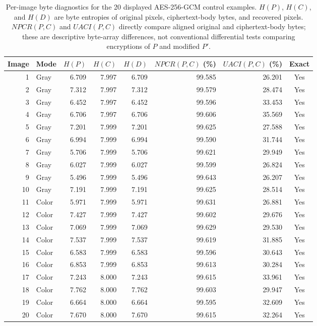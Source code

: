 \documentclass[letterpaper,journal]{IEEEtran}
\begin{document}
\begin{table}[!t]
\caption{Per-image byte diagnostics for the 20 displayed AES-256-GCM control examples. $H(P)$, $H(C)$, and $H(D)$ are byte entropies of original pixels, ciphertext-body bytes, and recovered pixels. $NPCR(P,C)$ and $UACI(P,C)$ directly compare aligned original and ciphertext-body bytes; these are descriptive byte-array differences, not conventional differential tests comparing encryptions of $P$ and modified $P'$.}
\label{tab:per-image-metrics}
\centering\small
\setlength{\tabcolsep}{4pt}\renewcommand{\arraystretch}{1.05}
\begin{tabular}{rlrrrrrc}
\toprule
Image & Mode & $H(P)$ & $H(C)$ & $H(D)$ & $NPCR(P,C)$ (\%) & $UACI(P,C)$ (\%) & Exact \\
\midrule
1 & Gray & 6.709 & 7.997 & 6.709 & 99.585 & 26.201 & Yes \\
2 & Gray & 7.312 & 7.997 & 7.312 & 99.579 & 28.474 & Yes \\
3 & Gray & 6.452 & 7.997 & 6.452 & 99.596 & 33.453 & Yes \\
4 & Gray & 6.706 & 7.997 & 6.706 & 99.606 & 35.569 & Yes \\
5 & Gray & 7.201 & 7.999 & 7.201 & 99.625 & 27.588 & Yes \\
6 & Gray & 6.994 & 7.999 & 6.994 & 99.590 & 31.744 & Yes \\
7 & Gray & 5.706 & 7.999 & 5.706 & 99.621 & 29.949 & Yes \\
8 & Gray & 6.027 & 7.999 & 6.027 & 99.599 & 26.824 & Yes \\
9 & Gray & 5.496 & 7.999 & 5.496 & 99.643 & 26.207 & Yes \\
10 & Gray & 7.191 & 7.999 & 7.191 & 99.625 & 28.514 & Yes \\
11 & Color & 5.971 & 7.999 & 5.971 & 99.631 & 26.881 & Yes \\
12 & Color & 7.427 & 7.999 & 7.427 & 99.602 & 29.676 & Yes \\
13 & Color & 7.069 & 7.999 & 7.069 & 99.629 & 29.530 & Yes \\
14 & Color & 7.537 & 7.999 & 7.537 & 99.619 & 31.885 & Yes \\
15 & Color & 6.583 & 7.999 & 6.583 & 99.596 & 30.643 & Yes \\
16 & Color & 6.853 & 7.999 & 6.853 & 99.613 & 30.284 & Yes \\
17 & Color & 7.243 & 8.000 & 7.243 & 99.615 & 33.961 & Yes \\
18 & Color & 7.762 & 8.000 & 7.762 & 99.603 & 29.947 & Yes \\
19 & Color & 6.664 & 8.000 & 6.664 & 99.595 & 32.609 & Yes \\
20 & Color & 7.670 & 8.000 & 7.670 & 99.615 & 32.264 & Yes \\
\bottomrule
\end{tabular}
\end{table}
\end{document}
